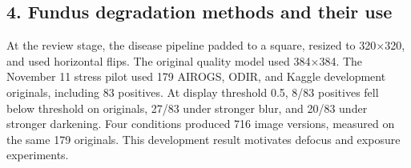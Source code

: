 \documentclass[
  10pt,
]{article}
\begin{document}
\subsection{4. Fundus degradation methods and their
use}\label{fundus-degradation-methods-and-their-use}

At the review stage, the disease pipeline padded to a square, resized to
320×320, and used horizontal flips. The original quality model used
384×384. The November 11 stress pilot used 179 AIROGS, ODIR, and Kaggle
development originals, including 83 positives. At display threshold 0.5,
8/83 positives fell below threshold on originals, 27/83 under stronger
blur, and 20/83 under stronger darkening. Four conditions produced 716
image versions, measured on the same 179 originals. This development
result motivates defocus and exposure experiments.
\end{document}
